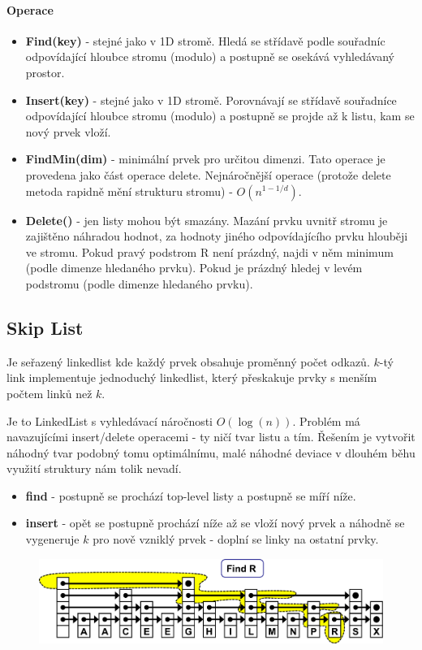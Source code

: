 \paragraph{Operace}
\begin{itemize}
\item \textbf{Find(key)} - stejné jako v 1D stromě. Hledá se střídavě podle souřadníc odpovídající hloubce stromu (modulo) a postupně se osekává vyhledávaný prostor.

\item \textbf{Insert(key)} - stejné jako v 1D stromě. Porovnávají se střídavě souřadníce odpovídající hloubce stromu (modulo) a postupně se projde až k listu, kam se nový prvek vloží.

\item \textbf{FindMin(dim)} - minimální prvek pro určitou dimenzi. Tato operace je provedena jako část operace delete. Nejnáročnější operace (protože delete metoda rapidně mění strukturu stromu) - $O(n^{1-1/d})$.

\item \textbf{Delete()} - jen listy mohou být smazány. Mazání prvku uvnitř stromu je zajištěno náhradou hodnot, za hodnoty jiného odpovídajícího prvku hlouběji ve stromu. Pokud pravý podstrom R není prázdný, najdi v něm minimum (podle dimenze hledaného prvku). Pokud je prázdný hledej v levém podstromu (podle dimenze hledaného prvku).
\end{itemize}

\subsection{Skip List}
Je seřazený linkedlist kde každý prvek obsahuje proměnný počet odkazů. $k$-tý link implementuje jednoduchý linkedlist, který přeskakuje prvky s menším počtem linků než $k$.

Je to LinkedList s vyhledávací náročnosti $O(\log(n))$. Problém má navazujícími insert/delete operacemi - ty ničí  tvar listu a tím. Řešením je vytvořit náhodný tvar podobný tomu optimálnímu, malé náhodné deviace v dlouhém běhu využití struktury nám tolik nevadí.

\begin{itemize}
\item \textbf{find} - postupně se prochází top-level listy a postupně se míří níže.
\item \textbf{insert} - opět se postupně prochází níže až se vloží nový prvek a náhodně se vygeneruje $k$ pro nově vzniklý prvek - doplní se linky na ostatní prvky.
\end{itemize}

\begin{figure}[h]
    \begin{center}
        \includegraphics[width=130mm]{spolecne/03/images/skiplist}
    \end{center}
\end{figure}